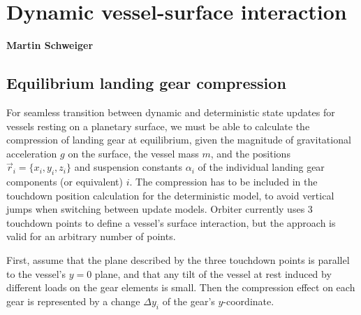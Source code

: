 \documentclass[Orbiter Technical Reference.tex]{subfiles}
\begin{document}
\section{Dynamic vessel-surface interaction}
\textbf{Martin Schweiger}


\subsection{Equilibrium landing gear compression}\label{ssec:equi_comp}
For seamless transition between dynamic and deterministic state updates for vessels resting on a planetary surface, we must be able to calculate the compression of landing gear at equilibrium, given the magnitude of gravitational acceleration $g$ on the surface, the vessel mass $m$, and the positions $\vec{r}_i = \lbrace x_i, y_i, z_i\rbrace$ and suspension constants $\alpha_i$ of the individual landing gear components (or equivalent) $i$. The compression has to be included in the touchdown position calculation for the deterministic model, to avoid vertical jumps when switching between update models. Orbiter currently uses 3 touchdown points to define a vessel's surface interaction, but the approach is valid for an arbitrary number of points.

First, assume that the plane described by the three touchdown points is parallel to the vessel's $y=0$ plane, and that any tilt of the vessel at rest induced by different loads on the gear elements is small. Then the compression effect on each gear is represented by a change $\Delta y_i$ of the gear's $y$-coordinate.
\end{document}
